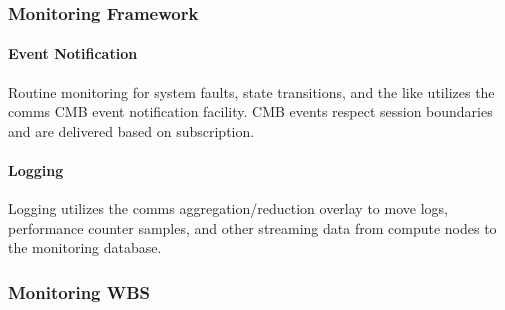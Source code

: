 \subsubsection{Monitoring Framework}

\paragraph{Event Notification}
Routine monitoring for system faults, state transitions, and the like
utilizes the comms CMB event notification facility.  CMB events respect
session boundaries and are delivered based on subscription.

\paragraph{Logging}
Logging utilizes the comms aggregation/reduction overlay to
move logs, performance counter samples, and other streaming data
from compute nodes to the monitoring database.

\newpage

\subsubsection{Monitoring WBS}

